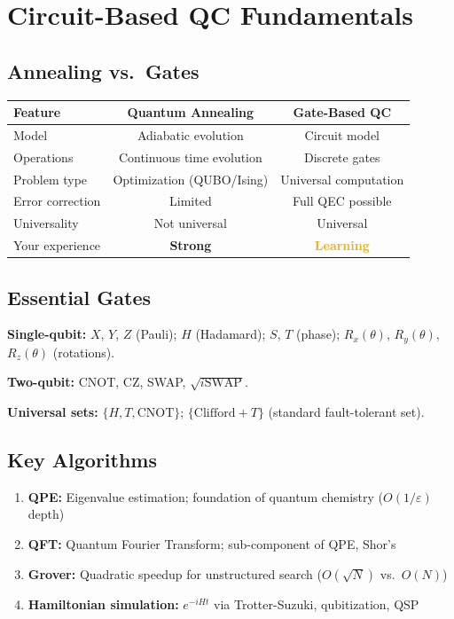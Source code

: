 \documentclass[11pt,a4paper]{article}
\begin{document}
\section{Circuit-Based QC Fundamentals}

\subsection{Annealing vs.\ Gates}

\begin{table}[H]
\centering
\begin{tabular}{lcc}
\toprule
\textbf{Feature} & \textbf{Quantum Annealing} & \textbf{Gate-Based QC} \\
\midrule
Model & Adiabatic evolution & Circuit model \\
Operations & Continuous time evolution & Discrete gates \\
Problem type & Optimization (QUBO/Ising) & Universal computation \\
Error correction & Limited & Full QEC possible \\
Universality & Not universal & Universal \\
Your experience & \textcolor{green!50!black}{\textbf{Strong}} & \textcolor{orange}{\textbf{Learning}} \\
\bottomrule
\end{tabular}
\end{table}

\subsection{Essential Gates}

\textbf{Single-qubit:} $X$, $Y$, $Z$ (Pauli); $H$ (Hadamard); $S$, $T$ (phase); $R_x(\theta)$, $R_y(\theta)$, $R_z(\theta)$ (rotations).

\textbf{Two-qubit:} CNOT, CZ, SWAP, $\sqrt{i\text{SWAP}}$.

\textbf{Universal sets:} $\{H, T, \text{CNOT}\}$; $\{\text{Clifford} + T\}$ (standard fault-tolerant set).

\subsection{Key Algorithms}
\begin{enumerate}
    \item \textbf{QPE:} Eigenvalue estimation; foundation of quantum chemistry ($O(1/\varepsilon)$ depth)
    \item \textbf{QFT:} Quantum Fourier Transform; sub-component of QPE, Shor's
    \item \textbf{Grover:} Quadratic speedup for unstructured search ($O(\sqrt{N})$ vs.\ $O(N)$)
    \item \textbf{Hamiltonian simulation:} $e^{-iHt}$ via Trotter-Suzuki, qubitization, QSP
\end{enumerate}
\end{document}
